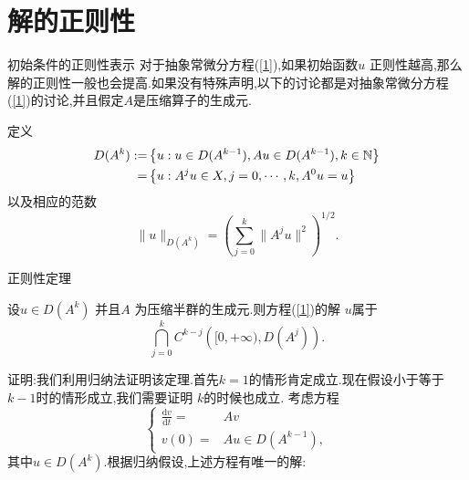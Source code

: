 \section{解的正则性}
\begin{frame}[t]{初始条件的正则性表示}
  对于抽象常微分方程(\ref{1}),如果初始函数$u$ 正则性越高,那么解的正则性一般也会提高.如果没有特殊声明,以下的讨论都是对抽象常微分方程(\ref{1})的讨论,并且假定$A$是压缩算子的生成元.
\begin{definition}
 定义
  \begin{equation}
   \begin{aligned}
     D(A^{k}):= & \left\{u:u\in D(A^{k-1}),Au\in D(A^{k-1}),k\in \mathbb{N}\right\} \\
     =& \left\{u: A^{j}u \in  X,j=0,\cdots,k,A^{0}u=u\right\}
   \end{aligned}
 \end{equation}
 以及相应的范数
 \begin{equation}
   \|u\|_{D(A^{k})}=\left( \sum_{j=0}^{k} \|A^{j}u\|^2 \right) ^{1 /2}.
 \end{equation}
\end{definition}
\end{frame}

\begin{frame}[t]{正则性定理}
  \begin{theorem}
    设$u\in D(A^{k})$ 并且$A$ 为压缩半群的生成元.则方程{\normalfont(\ref{1})}的解 $u$属于
     \[
       \bigcap_{j=0} ^{k}C^{k-j}\left( [0,+\infty),D(A^{j}) \right) .
    \] 
  \end{theorem}
  证明:我们利用归纳法证明该定理.首先$k=1$的情形肯定成立.现在假设小于等于$k-1$时的情形成立,我们需要证明 $k$的时候也成立.
  考虑方程
   \begin{equation}
    \left\{
      \begin{aligned}
      \frac{\mathrm{d}{v}}{\mathrm{d}t}=&A {v}\\
      {v}(0)=&Au \in D(A^{k-1}),
    \end{aligned}
      \right.
  \end{equation}
  其中$u\in  D(A^{k})$.根据归纳假设,上述方程有唯一的解:
    \end{frame}
   

